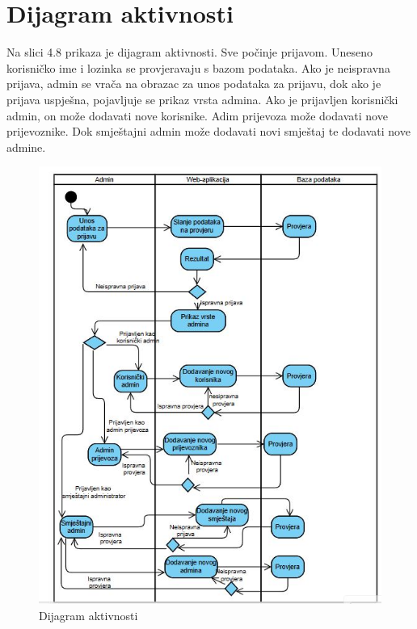 			
			\eject 
		
		\section{Dijagram aktivnosti}

		{Na slici 4.8 prikaza je dijagram aktivnosti. Sve počinje prijavom. Uneseno korisničko ime i lozinka se provjeravaju s bazom podataka. Ako je neispravna prijava, admin se vrača na obrazac za unos podataka za prijavu, dok ako je prijava uspješna, pojavljuje se prikaz vrsta admina.
		Ako je prijavljen korisnički admin, on može dodavati nove korisnike. Adim prijevoza može dodavati nove prijevoznike. Dok smještajni admin može dodavati novi smještaj te dodavati nove admine.}
			
		\begin{figure}[H]
			\includegraphics[width=\linewidth]{slike/Dijagram aktivnsti.JPG}
			\centering
			\caption{Dijagram aktivnosti}
			\label{fig:Dijagram aktivnosti}
		\end{figure}


